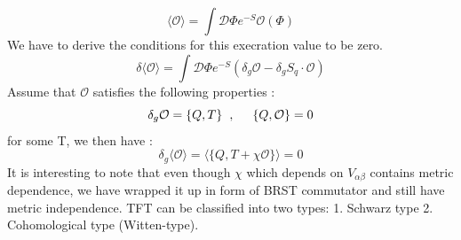 \begin{equation}
 \langle \mathcal{O} \rangle = \int \mathcal{D} \Phi e^{-S} \mathcal{O}(\Phi)
 \end{equation}
We have to derive the conditions for this execration value to be zero. 
\begin{equation}
\delta \langle \mathcal{O} \rangle = \int \mathcal{D} \Phi e^{-S} (\delta_{g} \mathcal{O} - \delta_{g} S_{q} \cdot \mathcal{O})
\end{equation}
Assume that $\mathcal{O}$ satisfies the following properties :
\begin{equation}
\delta_{g} \mathcal{O} = \{Q, T\}  \hspace{2mm} , \hspace{5mm} \{Q, \mathcal{O}\} = 0
\end{equation}
for some T, we then have :
\begin{equation}
\delta_{g}\langle \mathcal{O} \rangle = \langle \{Q, T + \chi \mathcal{O}\}\rangle = 0
\end{equation}
It is interesting to note that even though $\chi$ which depends on $V_{\alpha\beta}$ contains metric dependence, 
we have wrapped it up in form of BRST commutator and still have metric independence. TFT can be classified into
two types: 1. Schwarz type 2. Cohomological type (Witten-type). 
